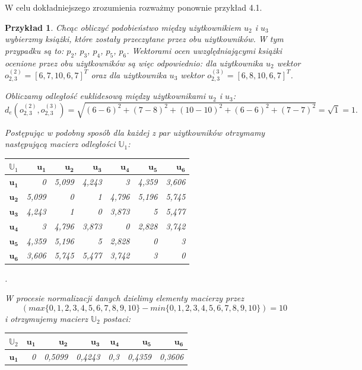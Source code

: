\documentclass[12pt,a4paper]{report}
\newtheorem{przyklad}{Przykład}[chapter]{\normalfont}
\begin{document}
W celu dokładniejszego zrozumienia rozważmy ponownie przykład 4.1.

\begin{przyklad}
Chcąc obliczyć podobieństwo między użytkownikiem $u_2$ i $u_3$ wybierzmy książki, które zostały przeczytane przez obu użytkowników. W tym przypadku są to: $p_2$, $p_3$, $p_4$, $p_5$, $p_6$. Wektorami ocen uwzględniającymi książki ocenione przez obu użytkowników są więc odpowiednio: dla użytkownika $u_2$ wektor $o_{2,3} ^{(2)} = [6, 7, 10, 6, 7] ^ T$ oraz dla użytkownika $u_3$ wektor $o_{2,3}^{(3)} = [6, 8, 10, 6, 7] ^ T$.

Obliczamy odległość euklidesową między użytkownikami $u_2$ i $u_3$: 
$$
d_{e}(o_{2,3}^{(2)},o_{2,3}^{(3)}) = \sqrt{(6-6)^2 + (7-8)^2 + (10-10)^2 + (6-6)^2 + (7-7)^2} = \sqrt{1} = 1.
$$

Postępując w podobny sposób dla każdej z par użytkowników otrzymamy następującą macierz odległości $\mathbb{U}_1$:
\begin{center}
\begin{tabular}{|r|r|r|r|r|r|r|} \hline
$\mathbb{U}_1$ & $\mathbf{u_1}$ & $\mathbf{u_2}$ & $\mathbf{u_3}$ & $\mathbf{u_4}$ & $\mathbf{u_5}$ & $\mathbf{u_6}$ \\
\hline
$\mathbf{u_1}$ & 0 & 5,099 & 4,243 & 3 & 4,359 & 3,606 \\
\hline
$\mathbf{u_2}$ & 5,099 & 0 & 1 & 4,796 & 5,196 & 5,745 \\
\hline
$\mathbf{u_3}$ & 4,243 & 1 & 0 & 3,873 & 5 & 5,477 \\
\hline
$\mathbf{u_4}$ & 3 & 4,796 & 3,873 & 0 & 2,828 & 3,742  \\
\hline 
$\mathbf{u_5}$ & 4,359 & 5,196 & 5 & 2,828 & 0 & 3 \\
\hline 
$\mathbf{u_6}$ & 3,606 & 5,745 & 5,477 & 3,742 & 3 & 0  \\
\hline 
\end{tabular}.
\end{center}
W procesie normalizacji danych dzielimy elementy macierzy przez 
$$
(max\{0,1,2,3,4,5,6,7,8,9,10\} - min\{0,1,2,3,4,5,6,7,8,9,10\}) = 10
$$ 
i otrzymujemy macierz $\mathbb{U}_2$ postaci:
\begin{center}
\begin{tabular}{|r|r|r|r|r|r|r|} \hline
$\mathbb{U}_2$ & $\mathbf{u_1}$ & $\mathbf{u_2}$ & $\mathbf{u_3}$ & $\mathbf{u_4}$ & $\mathbf{u_5}$ & $\mathbf{u_6}$ \\
\hline
$\mathbf{u_1}$ & 0 & 0,5099 & 0,4243 & 0,3 & 0,4359 & 0,3606 \\

\end{tabular}
\end{center}
\end{przyklad}
\end{document}
